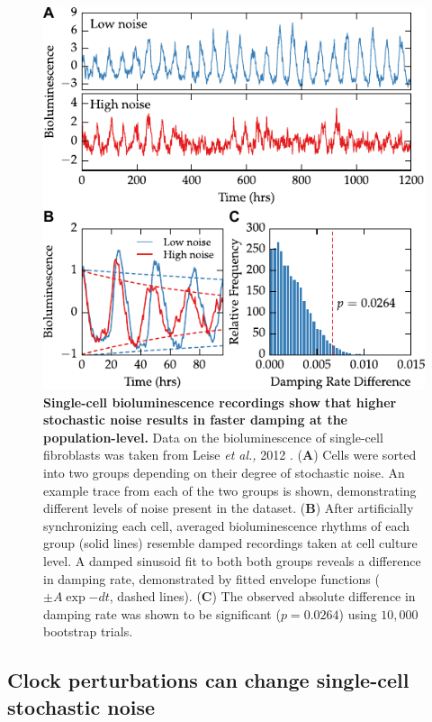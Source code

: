 \documentclass[11pt, letterpaper]{article}
\begin{document}
\begin{figure}[tbp]
  \begin{center}
    \includegraphics[]{figures/pdfs/noise_ts_and_boot.pdf}
  \end{center}
  \caption{{\bfseries Single-cell bioluminescence recordings show that higher stochastic noise results in faster damping at the population-level.}
  Data on the bioluminescence of single-cell fibroblasts was taken from Leise {\itshape et al.,} 2012 \cite{Leise2012}.
({\bfseries A}) Cells were sorted into two groups depending on their degree of stochastic noise. An example trace from each of the two groups is shown, demonstrating different levels of noise present in the dataset.
({\bfseries B}) After artificially synchronizing each cell, averaged bioluminescence rhythms of each group (solid lines) resemble damped recordings taken at cell culture level. A damped sinusoid fit to both both groups reveals a difference in damping rate, demonstrated by fitted envelope functions ($\pm A\exp{-dt}$, dashed lines).
({\bfseries C}) The observed absolute difference in damping rate was shown to be significant ($p = 0.0264$) using $10,000$ bootstrap trials.}
\label{fig:fibroblast_noise}
\end{figure}


\subsection*{Clock perturbations can change single-cell stochastic noise}
\end{document}
